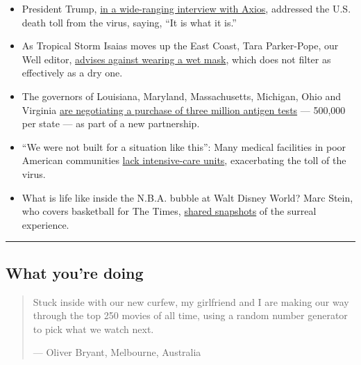 \begin{itemize}
\item
  President Trump,
  \href{https://www.axios.com/full-axios-hbo-interview-donald-trump-cd5a67e1-6ba1-46c8-bb3d-8717ab9f3cc5.html}{in
  a wide-ranging interview with Axios}, addressed the U.S. death toll
  from the virus, saying, ``It is what it is.''
\item
  As Tropical Storm Isaias moves up the East Coast, Tara Parker-Pope,
  our Well editor,
  \href{https://www.nytimes3xbfgragh.onion/2020/08/04/us/isaias-storm-updates.html\#link-e77dd06}{advises
  against wearing a wet mask}, which does not filter as effectively as a
  dry one.
\item
  The governors of Louisiana, Maryland, Massachusetts, Michigan, Ohio
  and Virginia
  \href{https://www.nytimes3xbfgragh.onion/2020/08/04/world/coronavirus-cases.html\#link-5673bec1}{are
  negotiating a purchase of three million antigen tests} --- 500,000 per
  state --- as part of a new partnership.
\item
  ``We were not built for a situation like this'': Many medical
  facilities in poor American communities
  \href{https://www.nytimes3xbfgragh.onion/2020/08/04/us/texas-coronavirus-rio-grande-valley-starr-county.html}{lack
  intensive-care units}, exacerbating the toll of the virus.
\item
  What is life like inside the N.B.A. bubble at Walt Disney World? Marc
  Stein, who covers basketball for The Times,
  \href{https://www.nytimes3xbfgragh.onion/interactive/2020/08/04/sports/nba-bubble-coronavirus.html}{shared
  snapshots} of the surreal experience.
\end{itemize}

\begin{center}\rule{0.5\linewidth}{\linethickness}\end{center}

\hypertarget{what-youre-doing}{%
\subsection{What you're doing}\label{what-youre-doing}}

\begin{quote}
Stuck inside with our new curfew, my girlfriend and I are making our way
through the top 250 movies of all time, using a random number generator
to pick what we watch next.

--- Oliver Bryant, Melbourne, Australia
\end{quote}

